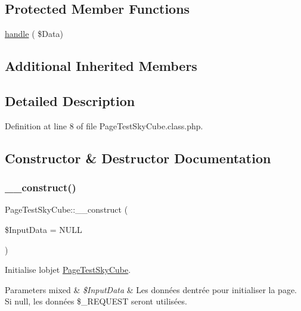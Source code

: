 \subsection*{Protected Member Functions}
\begin{DoxyCompactItemize}
\item 
\hyperlink{class_page_test_sky_cube_ae6489f90f41cdf80edb1b0b435e1c262}{handle} ( \$Data)
\end{DoxyCompactItemize}
\subsection*{Additional Inherited Members}


\subsection{Detailed Description}


Definition at line 8 of file Page\+Test\+Sky\+Cube.\+class.\+php.



\subsection{Constructor \& Destructor Documentation}
\mbox{\label{class_page_test_sky_cube_aa0f83f12c60b713d7e34da2596e30cdb}} 
\subsubsection{\texorpdfstring{\+\_\+\+\_\+construct()}{\_\_construct()}}
{\footnotesize\ttfamily Page\+Test\+Sky\+Cube\+::\+\_\+\+\_\+construct (\begin{DoxyParamCaption}\item[{}]{\$\+Input\+Data = {\ttfamily NULL} }\end{DoxyParamCaption})}

Initialise l\textquotesingle{}objet \hyperlink{class_page_test_sky_cube}{Page\+Test\+Sky\+Cube}.


\begin{DoxyParams}[1]{Parameters}
mixed & {\em \$\+Input\+Data} & Les données d\textquotesingle{}entrée pour initialiser la page. Si null, les données \$\+\_\+\+R\+E\+Q\+U\+E\+ST seront utilisées. \\
\hline
\end{DoxyParams}


